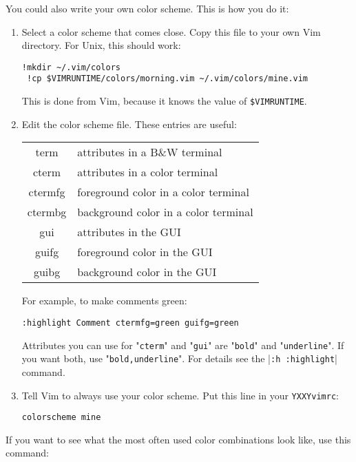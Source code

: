You could also write your own color scheme.
This is how you do it:
\begin{enumerate}
				\item Select a color scheme that comes close.
								Copy this file to your own Vim directory.
								For Unix, this should work:

								\begin{Verbatim}[samepage=true]
 !mkdir ~/.vim/colors
 !cp $VIMRUNTIME/colors/morning.vim ~/.vim/colors/mine.vim
 \end{Verbatim}

								This is done from Vim, because it knows the value of \verb!$VIMRUNTIME!.

				\item Edit the color scheme file.
								These entries are useful:

								\begin{tabular}{c l}
												term & attributes in a B\&W terminal\\
												cterm & attributes in a color terminal\\
												ctermfg & foreground color in a color terminal\\
												ctermbg & background color in a color terminal\\
												gui & attributes in the GUI\\
												guifg & foreground color in the GUI\\
												guibg & background color in the GUI\\
								\end{tabular}

								For example, to make comments green:

								\begin{Verbatim}[samepage=true]
 :highlight Comment ctermfg=green guifg=green
								\end{Verbatim}

								Attributes you can use for "\verb!cterm!" and "\verb!gui!" are "\verb!bold!" and "\verb!underline!".
								If you want both, use "\verb!bold,underline!".
								For details see the |\verb!:h :highlight!| command.

				\item Tell Vim to always use your color scheme.
								Put this line in your \verb!YXXYvimrc!:

								\begin{Verbatim}[samepage=true]
 colorscheme mine
 \end{Verbatim}

\end{enumerate}
If you want to see what the most often used color combinations look like, use this command:

